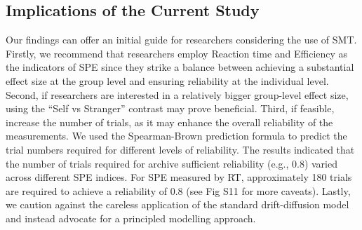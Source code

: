 \documentclass[sn-apa]{sn-jnl}%
\theoremstyle{thmstyleone}%
\theoremstyle{thmstyletwo}%
\theoremstyle{thmstylethree}%
\begin{document}
\subsection{Implications of the Current Study}\label{subsec:impl}
Our findings can offer an initial guide for researchers considering the use of SMT. Firstly, we recommend that researchers employ Reaction time and Efficiency as the indicators of SPE since they strike a balance between achieving a substantial effect size at the group level and ensuring reliability at the individual level. Second, if researchers are interested in a relatively bigger group-level effect size, using the ``Self vs Stranger” contrast may prove beneficial. Third, if feasible, increase the number of trials, as it may enhance the overall reliability of the measurements. We used the Spearman-Brown prediction formula \parencite{pronk2023can} to predict the trial numbers required for different levels of reliability. The results indicated that the number of trials required for archive sufficient reliability (e.g., 0.8) varied across different SPE indices. For SPE measured by RT, approximately 180 trials are required to achieve a reliability of 0.8 (see Fig S11 for more caveats). Lastly, we caution against the careless application of the standard drift-diffusion model and instead advocate for a principled modelling approach. 
\end{document}
